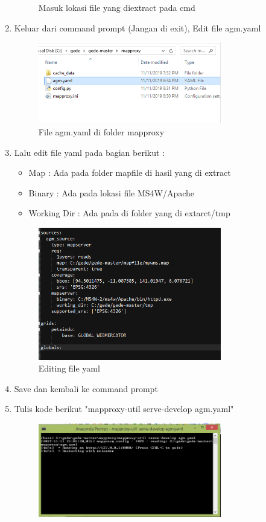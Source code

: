 \begin{enumerate}
\begin{figure}[H]
		\centering
		\caption{Masuk lokasi file yang diextract pada cmd}
	\end{figure}
    \item Keluar dari command prompt (Jangan di exit), Edit file agm.yaml
    \hfill\break
	\begin{figure}[H]
		\includegraphics[width=8cm]{figures/1174035/tugas4/yaml_4.png}
		\centering
		\caption{File agm.yaml di folder mapproxy}
	\end{figure}
    \item Lalu edit file yaml pada bagian berikut : 
    \begin{itemize}
        \item Map : Ada pada folder mapfile di hasil yang di extract
        \item Binary : Ada pada lokasi file MS4W/Apache
        \item Working Dir : Ada pada di folder yang di extarct/tmp
    \end{itemize}
    \hfill\break
	\begin{figure}[H]
		\includegraphics[width=8cm]{figures/1174035/tugas4/yaml_5.png}
		\centering
		\caption{Editing file yaml}
	\end{figure}
    \item Save dan kembali ke command prompt
    \item Tulis kode berikut "mapproxy-util serve-develop agm.yaml"
    \hfill\break
	\begin{figure}[H]
		\includegraphics[width=8cm]{figures/1174035/tugas4/yaml_6.png}

\end{figure}
\end{enumerate}

